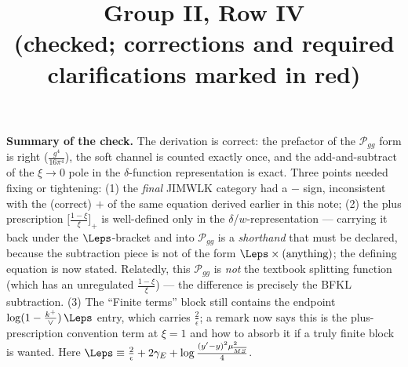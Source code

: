 \documentclass[9pt]{article}
\title{Group II, Row IV \\[2pt] {\normalsize (checked; corrections and required clarifications marked {\color{red}in red})}}
\author{}
\date{}
\numberwithin{equation}{section}
\begin{document}
\maketitle

{\color{red}\noindent\textbf{Summary of the check.} The derivation is correct: the prefactor of
the $\mathcal P_{gg}$ form is right ($\frac{g^{4}}{16\pi^{4}}$), the soft channel is counted
exactly once, and the add-and-subtract of the $\xi\to0$ pole in the $\delta$-function
representation is exact. Three points needed fixing or tightening: (1) the \emph{final} JIMWLK
category had a $-$ sign, inconsistent with the (correct) $+$ of the same equation derived
earlier in this note; (2) the plus prescription $\big[\frac{1-\xi}{\xi}\big]_{+}$ is
well-defined only in the $\delta$/$w$-representation --- carrying it back under the
$\Leps$-bracket and into $\mathcal P_{gg}$ is a \emph{shorthand} that must be declared, because
the subtraction piece is not of the form $\Leps\times(\text{anything})$; the defining equation
is now stated. Relatedly, this $\mathcal P_{gg}$ is \emph{not} the textbook splitting function
(which has an unregulated $\frac{1-\xi}{\xi}$) --- the difference is precisely the BFKL
subtraction. (3) The ``Finite terms'' block still contains the endpoint
$\log(1-\frac{k^{+}}{\vee})\,\Leps$ entry, which carries $\frac{2}{\epsilon}$; a remark now
says this is the plus-prescription convention term at $\xi=1$ and how to absorb it if a truly
finite block is wanted. Here $\Leps\equiv\frac{2}{\epsilon}+2\gamma_{E}
+\log\frac{(y'-y)^{2}\mu^{2}_{\overline{MS}}}{4}$.}
\end{document}
